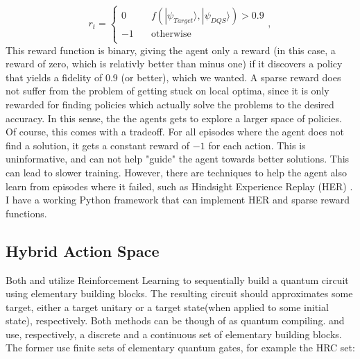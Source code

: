 \documentclass{article}
\begin{document}
\[   
r_t = 
     \begin{cases}
       \text{0} &\quad\text{$f(|\psi_{Target}\rangle, |\psi_{DQS}\rangle)>0.9$}\\
       \text{$-1$} &\quad\text{otherwise}\\
     
     \end{cases},
\]
This reward function is binary, giving the agent only a reward (in this case, a reward of zero, which is relativly better than minus one) if it discovers a policy that yields a fidelity of 0.9 (or better), which we wanted. A sparse reward does not suffer from the problem of getting stuck on local optima, since it is only rewarded for finding policies which actually solve the problems to the desired accuracy. In this sense, the the agents gets to explore a larger space of policies. Of course, this comes with a tradeoff. For all episodes where the agent does not find a solution, it gets a constant reward of $-1$ for each action. This is uninformative, and can not help "guide" the agent towards better solutions. This can lead to slower training. However, there are techniques to help the agent also learn from episodes where it failed, such as Hindsight Experience Replay (HER) \cite{andrychowicz2018hindsight, QuantumComp}. 
\newline
\newline
I have a working Python framework that can implement HER and sparse reward functions.

\subsection{Hybrid Action Space}

Both \cite{QuantumComp} and \cite{DQSRL} utilize Reinforcement Learning to sequentially build a quantum circuit using elementary building blocks. The resulting circuit should approximates some target, either a target unitary or a target state(when applied to some initial state), respectively. Both methods can be though of as quantum compiling.  
\newline
\newline
\cite{QuantumComp} and \cite{DQSRL} use, respectively, a discrete and a continuous set of elementary building blocks. The former use finite sets of elementary quantum gates, for example the HRC set:
\end{document}
